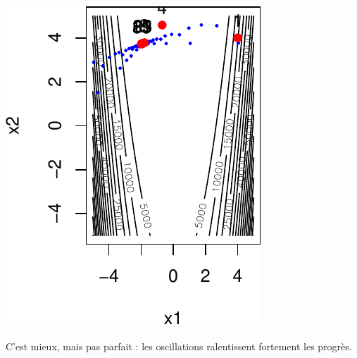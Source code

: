 \documentclass[12pt]{beamer}
\begin{document}
\begin{frame}
\begin{center}
\begin{minipage}[b]{0.3\textwidth}
\includegraphics[width=\textwidth]{gradient_rosen_LS_x-crop.pdf} 
\end{minipage}
\end{center}
C’est mieux, mais pas parfait : les oscillations ralentissent fortement les progrès.
\end{frame}
\end{document}
